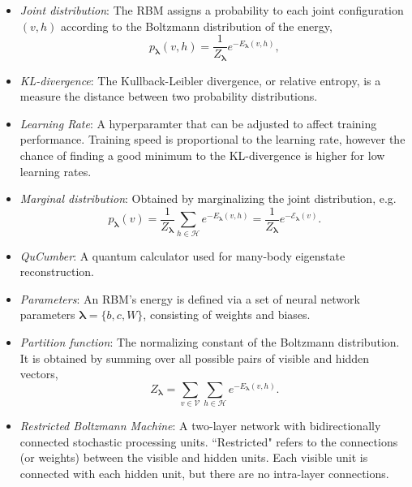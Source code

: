 \documentclass[submission, Phys]{SciPost}
\begin{document}
\begin{itemize}
	\item {\it Joint distribution}: The RBM assigns a probability to each joint configuration $(v,h)$ according to the Boltzmann distribution of the energy,
	      \begin{equation}
		      p_{\bm{\lambda}}(v,h) = \frac{1}{Z_{\bm{\lambda}}} e^{-E_{\bm{\lambda}}(v,h)},
	      \end{equation}
	      
	      \item{\it KL-divergence}: The Kullback-Leibler divergence, or relative entropy, is a measure the distance between two probability distributions.

\item{\it Learning Rate}: A hyperparamter that can be adjusted to affect training performance.  Training speed is proportional to the learning rate, however the chance of finding a good minimum to the KL-divergence is higher for low learning rates.


	\item {\it Marginal distribution}: Obtained by marginalizing the joint distribution, e.g.
	      \begin{equation}
		      \label{Eq:marginal_distribution}
		      p_{\bm{\lambda}}(v) = \frac{1}{Z_{\bm{\lambda}}} \sum\limits_{h\in \mathcal{H}} e^{-E_{\bm{\lambda}}(v,h)} = \frac{1}{Z_{\bm{\lambda}}} e^{- \mathcal{E}_{\bm{\lambda}}(v)}.
	      \end{equation}

	\item {\it QuCumber}: A quantum calculator used for many-body eigenstate reconstruction.

	\item {\it Parameters}: An RBM's energy is defined via a set of neural network parameters $\bm{\lambda} = \{b,c,W\}$, consisting of weights and biases.

	\item {\it Partition function}: The normalizing constant of the Boltzmann distribution. It is obtained by summing over all possible pairs of visible and hidden vectors,
	      \begin{equation}
		      Z_{\bm{\lambda}} = \sum\limits_{v\in \mathcal{V}}\sum\limits_{h\in \mathcal{H}} e^{-E_{\bm{\lambda}}(v,h)}.
	      \end{equation}

	\item {\it Restricted Boltzmann Machine}: A two-layer network with bidirectionally connected stochastic processing units. ``Restricted" refers to the connections (or weights) between the visible and hidden units. Each visible unit is connected with each hidden unit, but there are no intra-layer connections.


\end{itemize}
\end{document}
